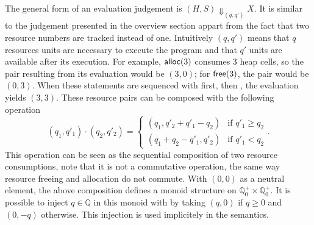 \documentclass[nocopyrightspace,preprint]{sigplanconf}
\begin{document}
The general form of an evaluation judgement is
$(H, S) \Downarrow_{(q,q')} X$.  It is similar to the judgement
presented in the overview section appart  from the fact that
two resource numbers are tracked instead of one.  Intuitively
$(q, q')$ means that $q$ resources units are necessary to execute
the program and that $q'$ units are available after its execution.
For example, $\mathsf{alloc}(3)$ consumes 3 heap cells, so
the pair resulting from its evaluation would be $(3, 0)$; for
$\mathsf{free}(3)$, the pair would be $(0, 3)$.  When these
statements are sequenced with  first, then ,
the evaluation yields $(3, 3)$.  These resource pairs can
be composed with the following operation
$$
(q_1, q'_1) \cdot (q_2, q'_2) =
\left\{
\begin{array}{ll}
(q_1, q'_2 + q'_1 - q_2) & \mbox{if } q'_1 \ge q_2 \\
(q_1 + q_2 - q'_1, q'_2) & \mbox{if } q'_1 < q_2
\end{array}
\right.
.
$$
This operation can be seen as the sequential composition of
two resource consumptions, note that it is not a commutative
operation, the same way resource freeing and allocation do not
commute.
With $(0, 0)$ as a neutral element, the above composition defines
a monoid structure on $\mathbb Q_0^+ \times \mathbb Q_0^+$.
It is possible to inject $q \in \mathbb Q$ in this monoid with by taking
$(q, 0)$ if $q \ge 0$ and $(0, -q)$ otherwise.  This injection
is used implicitely in the semantics.
\end{document}
